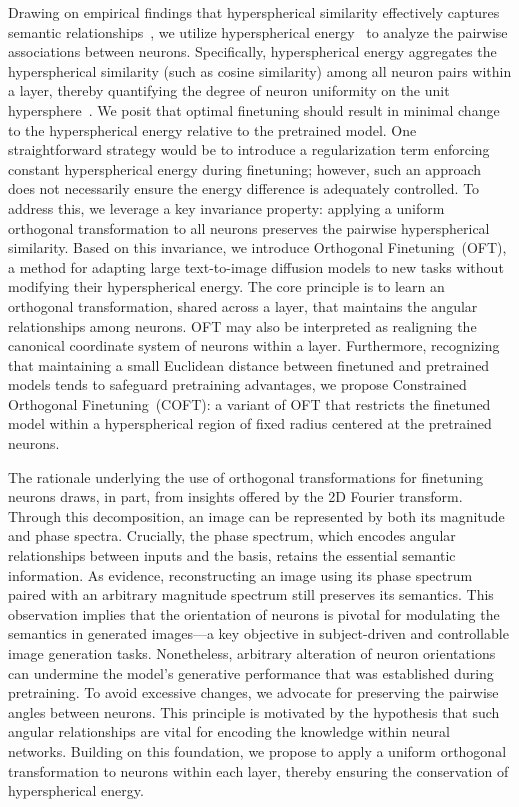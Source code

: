 Drawing on empirical findings that hyperspherical similarity effectively captures semantic relationships~\cite{liu2017deep,liu2018decoupled,chen2020angular}, we utilize hyperspherical energy~\cite{liu2018learning} to analyze the pairwise associations between neurons. Specifically, hyperspherical energy aggregates the hyperspherical similarity (such as cosine similarity) among all neuron pairs within a layer, thereby quantifying the degree of neuron uniformity on the unit hypersphere~\cite{liu2021learning}. We posit that optimal finetuning should result in minimal change to the hyperspherical energy relative to the pretrained model. One straightforward strategy would be to introduce a regularization term enforcing constant hyperspherical energy during finetuning; however, such an approach does not necessarily ensure the energy difference is adequately controlled. To address this, we leverage a key invariance property: applying a uniform orthogonal transformation to all neurons preserves the pairwise hyperspherical similarity. Based on this invariance, we introduce Orthogonal Finetuning~(OFT), a method for adapting large text-to-image diffusion models to new tasks without modifying their hyperspherical energy. The core principle is to learn an orthogonal transformation, shared across a layer, that maintains the angular relationships among neurons. OFT may also be interpreted as realigning the canonical coordinate system of neurons within a layer. Furthermore, recognizing that maintaining a small Euclidean distance between finetuned and pretrained models tends to safeguard pretraining advantages, we propose Constrained Orthogonal Finetuning~(COFT): a variant of OFT that restricts the finetuned model within a hyperspherical region of fixed radius centered at the pretrained neurons.

The rationale underlying the use of orthogonal transformations for finetuning neurons draws, in part, from insights offered by the 2D Fourier transform. Through this decomposition, an image can be represented by both its magnitude and phase spectra. Crucially, the phase spectrum, which encodes angular relationships between inputs and the basis, retains the essential semantic information. As evidence, reconstructing an image using its phase spectrum paired with an arbitrary magnitude spectrum still preserves its semantics. This observation implies that the orientation of neurons is pivotal for modulating the semantics in generated images—a key objective in subject-driven and controllable image generation tasks. Nonetheless, arbitrary alteration of neuron orientations can undermine the model’s generative performance that was established during pretraining. To avoid excessive changes, we advocate for preserving the pairwise angles between neurons. This principle is motivated by the hypothesis that such angular relationships are vital for encoding the knowledge within neural networks. Building on this foundation, we propose to apply a uniform orthogonal transformation to neurons within each layer, thereby ensuring the conservation of hyperspherical energy.

